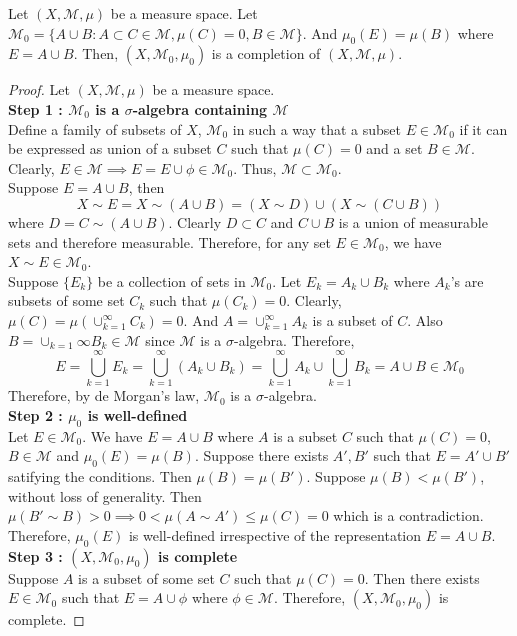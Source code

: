 \begin{theorem}[completion]
	Let $(X,\mathcal{M},\mu)$ be a measure space.
	Let $\mathcal{M}_0 = \{ A \cup B : A \subset C \in \mathcal{M}, \mu(C) = 0, B \in \mathcal{M} \}$.
	And $\mu_0(E) = \mu(B)$ where $E = A \cup B$.
	Then, $(X,\mathcal{M}_0,\mu_0)$ is a completion of $(X,\mathcal{M},\mu)$.
\end{theorem}
\begin{proof}
	Let $(X,\mathcal{M},\mu)$ be a measure space.\\

	\textbf{Step 1 : $\mathcal{M}_0$ is a $\sigma$-algebra containing $\mathcal{M}$}\\
	Define a family of subsets of $X$, $\mathcal{M}_0$ in such a way that a subset $E \in \mathcal{M}_0$ if it can be expressed as union of a subset $C$ such that $\mu(C) = 0$ and a set $B \in \mathcal{M}$.
	Clearly, $E \in \mathcal{M} \implies E = E \cup \phi \in \mathcal{M}_0$.
	Thus, $\mathcal{M} \subset \mathcal{M}_0$.\\

	Suppose $E = A \cup B$, then $$X \sim E = X \sim (A \cup B) = (X \sim D) \cup (X \sim (C \cup B))$$ where $D = C \sim (A \cup B)$.
	Clearly $D \subset C$ and $C \cup B$ is a union of measurable sets and therefore measurable.
	Therefore, for any set $E \in \mathcal{M}_0$, we have $X \sim E \in \mathcal{M}_0$.\\

	Suppose $\{ E_k \}$ be a collection of sets in $\mathcal{M}_0$.
	Let $E_k = A_k \cup B_k$ where $A_k$'s are subsets of some set $C_k$ such that $\mu(C_k) = 0$.
	Clearly,$\mu(C) = \mu(\cup_{k=1}^\infty C_k) = 0$.
	And $A = \cup_{k=1}^\infty A_k$ is a subset of $C$.
	Also $B = \cup_{k=1}\infty B_k \in \mathcal{M}$ since $\mathcal{M}$ is a $\sigma$-algebra.
	Therefore,
	\[ E = \bigcup_{k=1}^\infty E_k = \bigcup_{k=1}^\infty (A_k \cup B_k) = \bigcup_{k=1}^\infty A_k \cup \bigcup_{k=1}^\infty B_k = A \cup B \in \mathcal{M}_0 \]
	Therefore, by de Morgan's law, $\mathcal{M}_0$ is a $\sigma$-algebra.\\

	\textbf{Step 2 : $\mu_0$ is well-defined}\\
		Let $E \in \mathcal{M}_0$.
		We have $E = A \cup B$ where $A$ is a subset $C$ such that $\mu(C) = 0$, $B \in \mathcal{M}$ and $\mu_0(E) = \mu(B)$.
		Suppose there exists $A',B'$ such that $E = A' \cup B'$ satifying the conditions.
		Then $\mu(B) = \mu(B')$.
		Suppose $\mu(B) < \mu(B')$, without loss of generality.
		Then $\mu(B' \sim B) > 0 \implies 0 < \mu(A \sim A') \le \mu(C) = 0$ which is a contradiction.
		Therefore, $\mu_0(E)$ is well-defined irrespective of the representation $E = A \cup B$.\\

	\textbf{Step 3 : $(X,\mathcal{M}_0,\mu_0)$ is complete}\\
	Suppose $A$ is a subset of some set $C$ such that $\mu(C) = 0$.
	Then there exists $E \in \mathcal{M}_0$ such that $E = A \cup \phi$ where $\phi \in \mathcal{M}$.
	Therefore, $(X,\mathcal{M}_0,\mu_0)$ is complete.
\end{proof}

